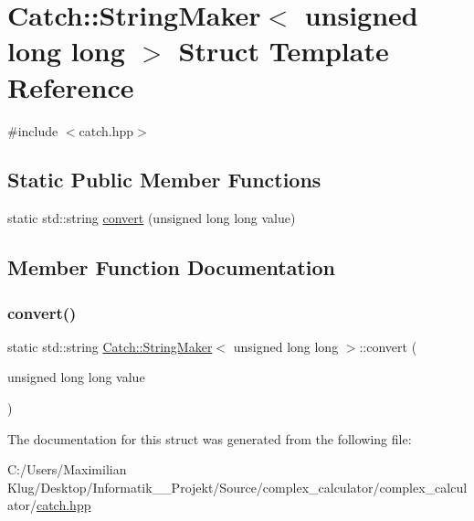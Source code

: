 \hypertarget{struct_catch_1_1_string_maker_3_01unsigned_01long_01long_01_4}{}\section{Catch\+:\+:String\+Maker$<$ unsigned long long $>$ Struct Template Reference}
\label{struct_catch_1_1_string_maker_3_01unsigned_01long_01long_01_4}


{\ttfamily \#include $<$catch.\+hpp$>$}

\subsection*{Static Public Member Functions}
\begin{DoxyCompactItemize}
\item 
static std\+::string \mbox{\hyperlink{struct_catch_1_1_string_maker_3_01unsigned_01long_01long_01_4_a6a8708af4fc8df3f52d7eab779b6bc6f}{convert}} (unsigned long long value)
\end{DoxyCompactItemize}


\subsection{Member Function Documentation}
\mbox{\label{struct_catch_1_1_string_maker_3_01unsigned_01long_01long_01_4_a6a8708af4fc8df3f52d7eab779b6bc6f}} 
\subsubsection{\texorpdfstring{convert()}{convert()}}
{\footnotesize\ttfamily static std\+::string \mbox{\hyperlink{struct_catch_1_1_string_maker}{Catch\+::\+String\+Maker}}$<$ unsigned long long $>$\+::convert (\begin{DoxyParamCaption}\item[{unsigned long long}]{value }\end{DoxyParamCaption})\hspace{0.3cm}{\ttfamily [static]}}



The documentation for this struct was generated from the following file\+:\begin{DoxyCompactItemize}
\item 
C\+:/\+Users/\+Maximilian Klug/\+Desktop/\+Informatik\+\_\+\_\+\+Projekt/\+Source/complex\+\_\+calculator/complex\+\_\+calculator/\mbox{\hyperlink{catch_8hpp}{catch.\+hpp}}\end{DoxyCompactItemize}
